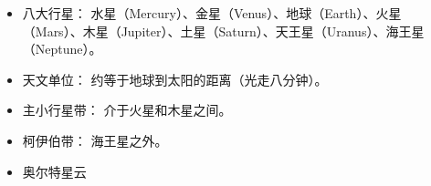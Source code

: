 
\begin{issues}
\issueDraft
\end{issues}

\begin{itemize}
\item 八大行星： 水星（Mercury）、金星（Venus）、地球（Earth）、火星（Mars）、木星（Jupiter）、土星（Saturn）、天王星（Uranus）、海王星（Neptune）。
\item 天文单位： 约等于地球到太阳的距离（光走八分钟）。
\item 主小行星带： 介于火星和木星之间。
\item 柯伊伯带： 海王星之外。
\item 奥尔特星云
\end{itemize}

